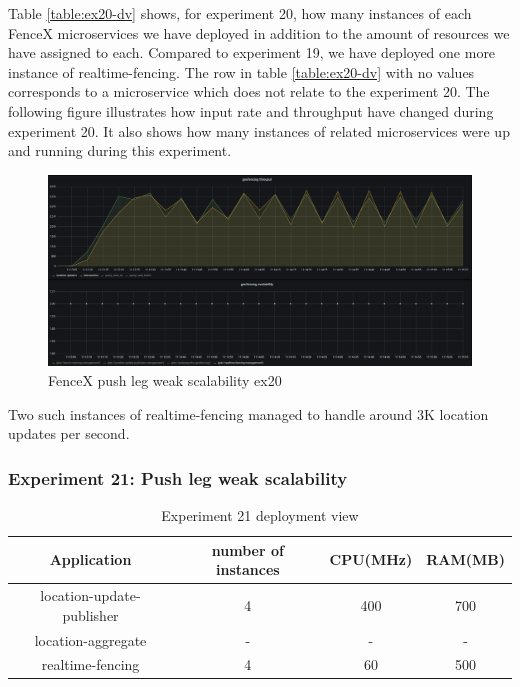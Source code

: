 \documentclass[a4]{report}
\begin{document}
    Table \ref{table:ex20-dv} shows, for experiment 20, how many instances of each FenceX microservices we have
    deployed in addition to the amount of resources we have assigned to each.
    Compared to experiment 19, we have deployed one more instance of realtime-fencing.
    The row in table \ref{table:ex20-dv} with no values corresponds to a microservice which does not relate to the
    experiment 20.
    The following figure illustrates how input rate and throughput have changed during experiment 20.
    It also shows how many instances of related microservices were up and running during this experiment.

    \begin{figure}
        \caption{FenceX push leg weak scalability ex20}
        \label{fig:ex20}
        \includegraphics[scale=0.5]{images/evaluation/ex20-benchmarking-ongoing-1per10sec.png}
    \end{figure}

    \clearpage

    Two such instances of realtime-fencing managed to handle around 3K location updates per second.

    \subsubsection{Experiment 21: Push leg weak scalability}
    \begin{table}[h!]
        \centering
        \begin{tabular}{|c|c|c|c|}
            \hline
            Application               & number of instances & CPU(MHz) & RAM(MB) \\
            \hline
            location-update-publisher & 4                   & 400      & 700     \\
            location-aggregate        & -                   & -        & -       \\
            realtime-fencing          & 4                   & 60       & 500     \\
            \hline
        \end{tabular}
        \caption{Experiment 21 deployment view}
        \label{table:ex21-dv}
    \end{table}
\end{document}
